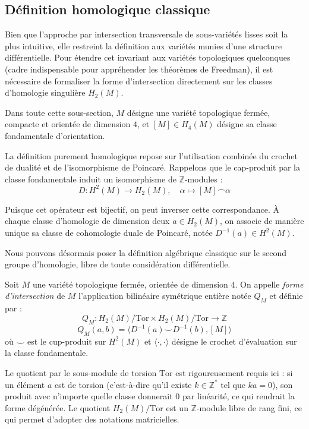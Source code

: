\subsection{Définition homologique classique}

Bien que l'approche par intersection transversale de sous-variétés lisses soit la plus intuitive, elle restreint la définition aux variétés munies d'une structure différentielle. Pour étendre cet invariant aux variétés topologiques quelconques (cadre indispensable pour appréhender les théorèmes de Freedman), il est nécessaire de formaliser la forme d'intersection directement sur les classes d'homologie singulière $H_2(M)$.

Dans toute cette sous-section, $M$ désigne une variété topologique fermée, compacte et orientée de dimension $4$, et $[M] \in H_4(M)$ désigne sa classe fondamentale d'orientation.

La définition purement homologique repose sur l'utilisation combinée du crochet de dualité et de l'isomorphisme de Poincaré. Rappelons que le cap-produit par la classe fondamentale induit un isomorphisme de $\mathbb{Z}$-modules :
\[
D : H^2(M) \longrightarrow H_2(M), \quad \alpha \mapsto [M] \frown \alpha
\]

Puisque cet opérateur est bijectif, on peut inverser cette correspondance. À chaque classe d'homologie de dimension deux $a \in H_2(M)$, on associe de manière unique sa classe de cohomologie duale de Poincaré, notée $D^{-1}(a) \in H^2(M)$.

Nous pouvons désormais poser la définition algébrique classique sur le second groupe d'homologie, libre de toute considération différentielle.

\begin{definition}
Soit $M$ une variété topologique fermée, orientée de dimension $4$. On appelle \emph{forme d'intersection} de $M$ l'application bilinéaire symétrique entière notée $Q_M$ et définie par :
\[
Q_M : H_2(M)/\text{Tor} \times H_2(M)/\text{Tor} \longrightarrow \mathbb{Z}
\]
\[
Q_M(a, b) = \langle D^{-1}(a) \smile D^{-1}(b), [M] \rangle
\]
où $\smile$ est le cup-produit sur $H^2(M)$ et $\langle \cdot, \cdot \rangle$ désigne le crochet d'évaluation sur la classe fondamentale.
\end{definition}

Le quotient par le sous-module de torsion $\text{Tor}$ est rigoureusement requis ici : si un élément $a$ est de torsion (c'est-à-dire qu'il existe $k \in \mathbb{Z}^*$ tel que $k a = 0$), son produit avec n'importe quelle classe donnerait $0$ par linéarité, ce qui rendrait la forme dégénérée. Le quotient $H_2(M)/\text{Tor}$ est un $\mathbb{Z}$-module libre de rang fini, ce qui permet d'adopter des notations matricielles.


